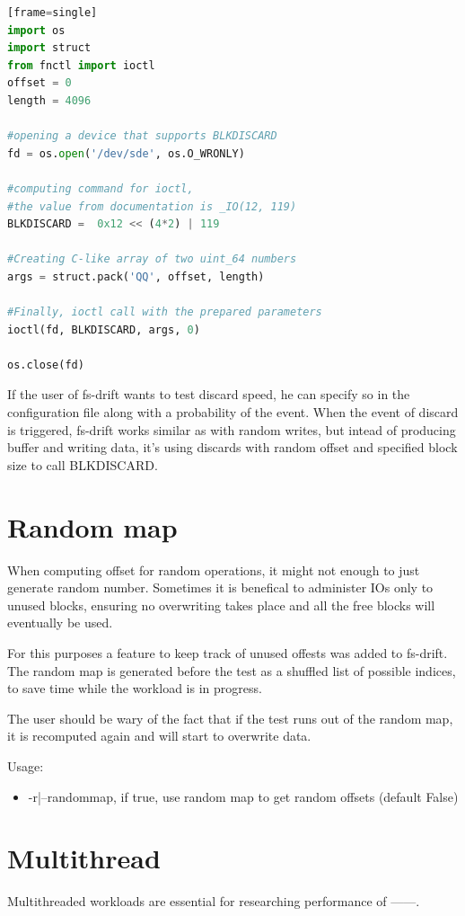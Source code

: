 \documentclass[
  color, %
  table, %
  lof,   %
  lot,   %
]{fithesis3}
\begin{document}
\begin{lstlisting}[language=Python, caption={Using BLKDISCARD ioctl to discard first 4096 bytes from the beginning of the device},label={ex:blkdiscard}][frame=single]
import os
import struct
from fnctl import ioctl
offset = 0
length = 4096

#opening a device that supports BLKDISCARD
fd = os.open('/dev/sde', os.O_WRONLY)    

#computing command for ioctl,
#the value from documentation is _IO(12, 119)
BLKDISCARD =  0x12 << (4*2) | 119

#Creating C-like array of two uint_64 numbers
args = struct.pack('QQ', offset, length)

#Finally, ioctl call with the prepared parameters
ioctl(fd, BLKDISCARD, args, 0)

os.close(fd)
\end{lstlisting}


If the user of fs-drift wants to test discard speed, he can specify so in the configuration file along with a probability of the event. When the event of discard is triggered, fs-drift works similar as with random writes, but intead of producing buffer and writing data, it's using discards with random offset and specified block size to call BLKDISCARD.

\section{Random map}
When computing offset for random operations, it might not enough to just generate random number. Sometimes it is benefical to administer IOs only to unused blocks, ensuring no overwriting takes place and all the free blocks will eventually be used.

For this purposes a feature to keep track of unused offests was added to fs-drift. The random map is generated before the test as a shuffled list of possible indices, to save time while the workload is in progress.

The user should be wary of the fact that if the test runs out of the random map, it is recomputed again and will start to overwrite data.

Usage:
\begin{itemize}
    \item -r|--randommap, if true, use random map to get random offsets (default False)
\end{itemize}

\section{Multithread}
Multithreaded workloads are essential for researching performance of ------.
\end{document}
